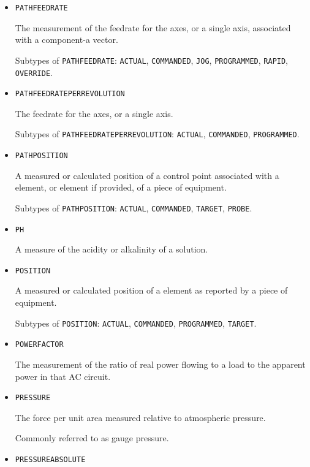 \begin{itemize}
\item \texttt{PATH\textunderscore FEEDRATE}  

The measurement of the feedrate for the axes, or a single axis, associated with a  component-a vector.

Subtypes of \texttt{PATH\textunderscore FEEDRATE}: \texttt{ACTUAL}, \texttt{COMMANDED}, \texttt{JOG}, \texttt{PROGRAMMED}, \texttt{RAPID}, \texttt{OVERRIDE}.

\item \texttt{PATH\textunderscore FEEDRATE\textunderscore PER\textunderscore REVOLUTION}  

The feedrate for the axes, or a single axis.

Subtypes of \texttt{PATH\textunderscore FEEDRATE\textunderscore PER\textunderscore REVOLUTION}: \texttt{ACTUAL}, \texttt{COMMANDED}, \texttt{PROGRAMMED}.

\item \texttt{PATH\textunderscore POSITION}  

A measured or calculated position of a control point associated with a  element, or  element if provided, of a piece of equipment.

Subtypes of \texttt{PATH\textunderscore POSITION}: \texttt{ACTUAL}, \texttt{COMMANDED}, \texttt{TARGET}, \texttt{PROBE}.

\item \texttt{PH}  

A measure of the acidity or alkalinity of a solution.


\item \texttt{POSITION}  

A measured or calculated position of a  element as reported by a piece of equipment.

Subtypes of \texttt{POSITION}: \texttt{ACTUAL}, \texttt{COMMANDED}, \texttt{PROGRAMMED}, \texttt{TARGET}.

\item \texttt{POWER\textunderscore FACTOR}  

The measurement of the ratio of real power flowing to a load to the apparent power in that AC circuit.


\item \texttt{PRESSURE}  

The force per unit area measured relative to atmospheric pressure. 

Commonly referred to as gauge pressure.


\item \texttt{PRESSURE\textunderscore ABSOLUTE}  


\end{itemize}
